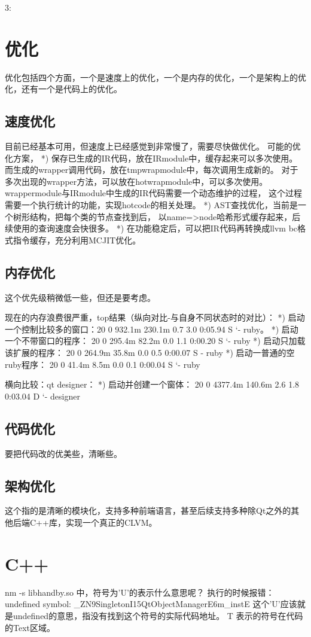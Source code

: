 3:

\chapter{优化}
优化包括四个方面，一个是速度上的优化，一个是内存的优化，一个是架构上的优化，还有一个是代码上的优化。
\section{速度优化}
目前已经基本可用，但速度上已经感觉到非常慢了，需要尽快做优化。
可能的优化方案，
*) 保存已生成的IR代码，放在IRmodule中，缓存起来可以多次使用。
而生成的wrapper调用代码，放在tmpwrapmodule中，每次调用生成新的。
对于多次出现的wrapper方法，可以放在hotwrapmodule中，可以多次使用。
wrappermodule与IRmodule中生成的IR代码需要一个动态维护的过程，
这个过程需要一个执行统计的功能，实现hotcode的相关处理。
*) AST查找优化，当前是一个树形结构，把每个类的节点查找到后，
以name=>node哈希形式缓存起来，后续使用的查询速度会快很多。
*) 在功能稳定后，可以把IR代码再转换成llvm bc格式指令缓存，充分利用MCJIT优化。


\section{内存优化}
这个优先级稍微低一些，但还是要考虑。

现在的内存浪费很严重，top结果（纵向对比-与自身不同状态时的对比）：
*) 启动一个控制比较多的窗口：20   0  932.1m 230.1m   0.7  3.0   0:05.94 S   `- ruby。
*) 启动一个不带窗口的程序： 20   0  295.4m  82.2m   0.0  1.1   0:00.20 S    `- ruby
*) 启动只加载该扩展的程序： 20   0  264.9m  35.8m   0.0  0.5   0:00.07 S    - ruby
*) 启动一普通的空ruby程序： 20   0   41.4m   8.5m   0.0  0.1   0:00.04 S   `- ruby

横向比较：qt designer：
*) 启动并创建一个窗体： 20   0 4377.4m 140.6m   2.6  1.8   0:03.04 D    `- designer

\section{代码优化}
要把代码改的优美些，清晰些。

\section{架构优化}
这个指的是清晰的模块化，支持多种前端语言，甚至后续支持多种除Qt之外的其他后端C++库，实现一个真正的CLVM。


\chapter{C++}
nm -s libhandby.so 中，符号为'U'的表示什么意思呢？
执行的时候报错：undefined symbol: \_ZN9SingletonI15QtObjectManagerE6m\_instE
这个'U'应该就是undefined的意思，指没有找到这个符号的实际代码地址。
T 表示的符号在代码的Text区域。

